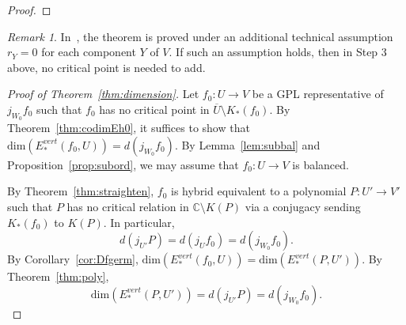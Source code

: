 \documentclass{amsart}
\numberwithin{equation}{section}
\theoremstyle{definition}
\theoremstyle{remark}
\newtheorem{remark}[theorem]{Remark}%
\begin{document}
\begin{proof}

\end{proof}
\begin{remark} In~\cite[Corollary 9]{Baranski}, the theorem is proved under an additional technical assumption $r_Y=0$ for each component $Y$ of $V$. If such an assumption holds, then in Step 3 above, no critical point is needed to add.
\end{remark}


\begin{proof}[Proof of Theorem~\ref{thm:dimension}] 
Let $f_0:U\to V$ be a GPL representative of $j_{W_0}f_0$ such that $f_0$ has no critical point in $\overline{U}\setminus K_*(f_0)$. By Theorem~\ref{thm:codimEh0}, it suffices to show that $\text{dim}(E^{vert}_*(f_0,U))=d(j_{W_0}f_0)$. 
By Lemma~\ref{lem:subbal} and Proposition~\ref{prop:subord}, we may assume that $f_0:U\to V$ is balanced. 

By Theorem~\ref{thm:straighten}, $f_0$ is hybrid equivalent to a polynomial $P:U'\to V'$ such that $P$ has no critical relation in $\mathbb{C}\setminus K(P)$ via a conjugacy sending $K_*(f_0)$ to $K(P)$. In particular, 
$$d(j_{U'}P)=d(j_U f_0)=d(j_{W_0}f_0).$$
By Corollary~\ref{cor:Dfgerm}, $\text{dim}(E^{vert}_*(f_0,U))=\text{dim}(E^{vert}_*(P, U'))$. 
By Theorem~\ref{thm:poly}, $$\text{dim}(E^{vert}_*(P,U'))=d(j_{U'}P)=d(j_{W_0}f_0).$$ 
\end{proof}
\end{document}
